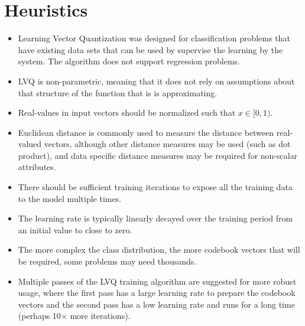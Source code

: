 \documentclass[a4paper, 11pt]{article}
\begin{document}
\section{Heuristics}
\label{sec:heuristics}
\begin{itemize}
	\item Learning Vector Quantization was designed for classification problems that have existing data sets that can be used by supervise the learning by the system. The algorithm does not support regression problems.
	\item LVQ is non-parametric, meaning that it does not rely on assumptions about that structure of the function that is is approximating.
	\item Real-values in input vectors should be normalized such that $x \in [0,1)$. 
	\item Euclidean distance is commonly used to measure the distance between real-valued vectors, although other distance measures may be used (such as dot product), and data specific distance measures may be required for non-scalar attributes.
	\item There should be sufficient training iterations to expose all the training data to the model multiple times.
	\item The learning rate is typically linearly decayed over the training period from an initial value to close to zero.
	\item The more complex the class distribution, the more codebook vectors that will be required, some problems may need thousands.
	\item Multiple passes of the LVQ training algorithm are suggested for more robust usage, where the first pass has a large learning rate to prepare the codebook vectors and the second pass has a low learning rate and runs for a long time (perhaps 10$\times$ more iterations).
\end{itemize}

\end{document}
